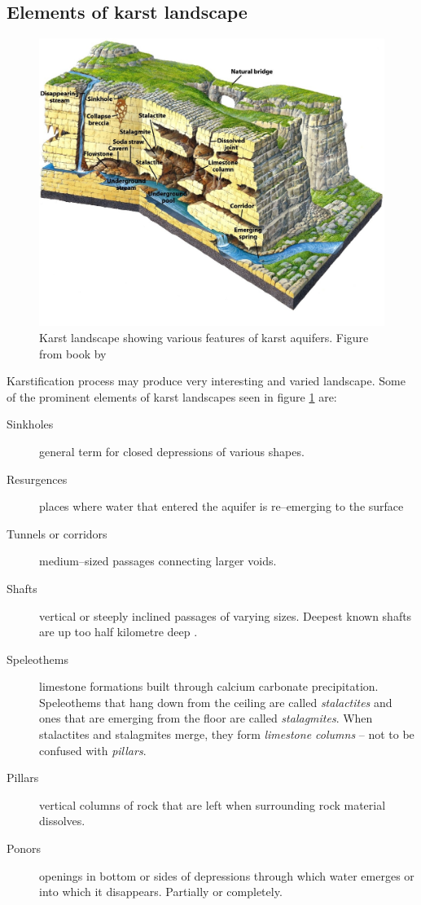 \subsection{Elements of karst landscape}

\begin{figure}
  \centerline{\includegraphics[width=\textwidth]{chapters/karstification/karst_landscape.jpg}}
  \caption{Karst landscape showing various features of karst aquifers.
    Figure from book by \cite{marshak2006}}
  \label{fig:karstlandscape}
\end{figure}


Karstification process may produce very interesting and varied landscape. Some
of the prominent elements of karst landscapes seen in figure \ref{fig:karstlandscape}
are:

\begin{description}
  \item[Sinkholes]
    general term for closed depressions of various shapes.
  \item[Resurgences]
    places where water that entered the aquifer is re--emerging to the surface
  \item[Tunnels or corridors] medium--sized passages connecting larger voids.
  \item[Shafts] vertical or steeply inclined passages of varying sizes. Deepest
    known shafts are up too half kilometre deep \parencite[p. 167]{karstglossary}.
  \item[Speleothems] limestone formations built through calcium carbonate
    precipitation. Speleothems that hang down from the ceiling are called
    \emph{stalactites} and ones that are emerging from the floor are called
    \emph{stalagmites}. When stalactites and stalagmites merge, they form
    \emph{limestone columns} -- not to be confused with \emph{pillars}.
  \item[Pillars] vertical columns of rock that are left when surrounding rock
    material dissolves.
  \item[Ponors] openings in bottom or sides of depressions through which water
    emerges or into which it disappears. Partially or completely.
\end{description}

